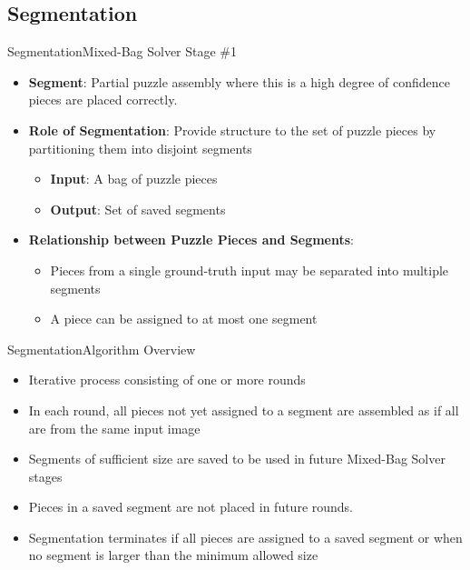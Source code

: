 \documentclass[10pt]{beamer}
\begin{document}
\subsection{Segmentation}
\begin{frame}{Segmentation}{Mixed-Bag Solver Stage \#1}
  \begin{itemize}
    \item \textbf{Segment}: Partial puzzle assembly where this is a high degree of confidence pieces are placed correctly.
    \vfill
    \item \textbf{Role of Segmentation}: Provide structure to the set of puzzle pieces by partitioning them into disjoint segments
    \begin{itemize}
      \vspace{0.4em}
      	\item \textbf{Input}: A bag of puzzle pieces
  		  \vspace{0.6em}
      \item \textbf{Output}: Set of saved segments
    \end{itemize}
	  \vfill
	  \item \textbf{Relationship between Puzzle Pieces and Segments}:
	  \vspace{0.4em}
	  \begin{itemize}
      \item Pieces from a single ground-truth input may be separated into multiple segments
  	  \vspace{0.6em}   
      \item A piece can be assigned to at most one segment   
    \end{itemize}
  \end{itemize}
\end{frame}



\begin{frame}{Segmentation}{Algorithm Overview}
  \begin{itemize}
    \item Iterative process consisting of one or more rounds  
    \vfill
    \item In each round, all pieces not yet assigned to a segment are assembled as if all are from the same input image
    \vfill
    \item Segments of sufficient size are saved to be used in future Mixed-Bag Solver stages
    \vfill
    \item Pieces in a saved segment are not placed in future rounds.
    \vfill
    \item Segmentation terminates if all pieces are assigned to a saved segment or when no segment is larger than the minimum allowed size
    \vfill
  \end{itemize}
\end{frame}
\end{document}
